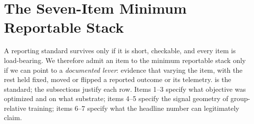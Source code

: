 \section{The Seven-Item Minimum Reportable Stack}
\label{sec:p5-stack}
A reporting standard survives only if it is short, checkable, and every item is
load-bearing. We therefore admit an item to the minimum reportable stack only
if we can point to a \emph{documented lever}: evidence that varying the item,
with the rest held fixed, moved or flipped a reported outcome or its
telemetry.  is the standard; the subsections justify
each row. Items 1--3 specify what objective was optimized and on what
substrate; items 4--5 specify the signal geometry of group-relative training;
items 6--7 specify what the headline number can legitimately claim.

